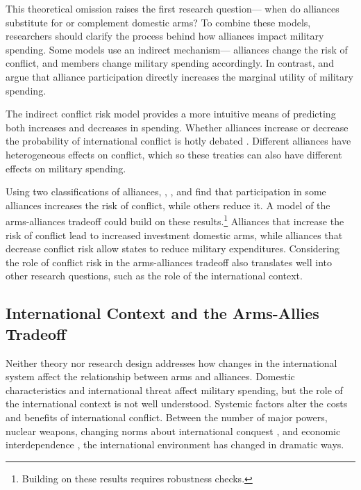 \documentclass[12pt]{article}
\begin{document}
This theoretical omission raises the first research question--- when do alliances substitute for or complement domestic arms? 
To combine these models, researchers should clarify the process behind how alliances impact military spending. 
Some models use an indirect mechanism--- alliances change the risk of conflict, and members change military spending accordingly. 
In contrast, \citet{Diehl1994} and \citet{MorganPalmer2006} argue that alliance participation directly increases the marginal utility of military spending.


The indirect conflict risk model provides a more intuitive means of predicting both increases and decreases in spending.
Whether alliances increase or decrease the probability of international conflict is hotly debated \citep{SiversonSullivan1984, Smith1995, Colaresi2005, JohnsonLeeds2011, Kenwicketal2015, Kang2017}.
Different alliances have heterogeneous effects on conflict, which so these treaties can also have different effects on military spending. 


Using two classifications of alliances, \citet{Benson2011}, \citet{Leeds2003}, and \citet{JohnsonLeeds2011} find that participation in some alliances increases the risk of conflict, while others reduce it. 
A model of the arms-alliances tradeoff could build on these results.\footnote{Building on these results requires robustness checks.} 
Alliances that increase the risk of conflict lead to increased investment domestic arms, while alliances that decrease conflict risk allow states to reduce military expenditures. 
Considering the role of conflict risk in the arms-alliances tradeoff also translates well into other research questions, such as the role of the international context. 



\subsection{International Context and the Arms-Allies Tradeoff}


Neither theory nor research design addresses how changes in the international system affect the relationship between arms and alliances. 
Domestic characteristics and international threat affect military spending, but the role of the international context is not well understood.
Systemic factors alter the costs and benefits of international conflict.
Between the number of major powers, nuclear weapons, changing norms about international conquest \citep{Fazal2011}, and economic interdependence \citep{Frieden2006}, the international environment has changed in dramatic ways.
\end{document}
